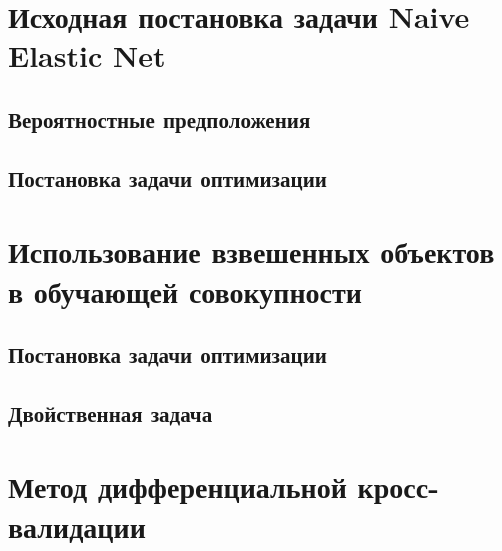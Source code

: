 \documentclass[12pt]{article}
\begin{document}

	\section{Исходная постановка задачи Naive Elastic Net}
		\subsection{Вероятностные предположения}	
		\subsection{Постановка задачи оптимизации} 	
	\section{Использование взвешенных объектов в обучающей совокупности}
		\subsection{Постановка задачи оптимизации} 	
		\subsection{Двойственная задача}			
	\section{Метод дифференциальной кросс-валидации}
		
		
		
\end{document}
